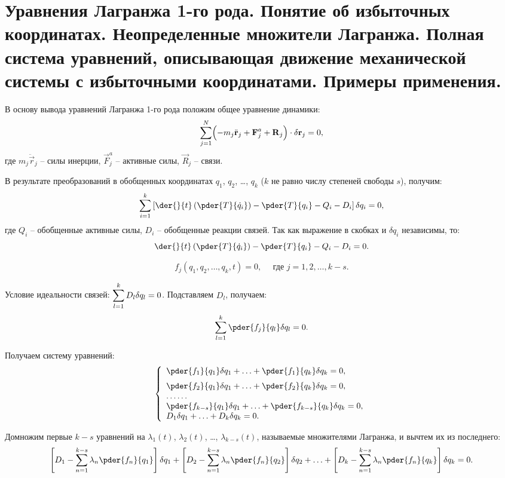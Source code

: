 \chapter{Уравнения Лагранжа 1-го рода. Понятие об избыточных координатах.
Неопределенные множители Лагранжа. Полная система уравнений, описывающая
движение механической системы с избыточными координатами. Примеры применения.}

В основу вывода уравнений Лагранжа 1-го рода положим общее уравнение динамики:
\[
    \sum\limits_{j=1}^N \Bigl(-m_j\ddot{\vec{r}}_j + \vec{F}^a_j + \vec{R}_j
    \Bigr)\cdot\delta\vec{r}_j = 0,
\]
где \( m_j\ddot{\vec{r}}_j \) -- силы инерции, \( \vec{F}^a_j \) -- активные
силы, \( \vec{R}_j \) -- связи.


В результате преобразований в обобщенных координатах \( q_1 \), \( q_2 \),
\ldots, \( q_k \) (\( k \) не равно числу степеней свободы \( s \)), получим:
\[
    \sum\limits_{i=1}^k \left[\der{}{t}\left(\pder{T}{\dot{q}_i}\right) -
    \pder{T}{q_i} - Q_i - D_i\right]\delta q_i = 0,
\]
где \( Q_i \) -- обобщенные активные силы, \( D_i \) -- обобщенные реакции
связей. Так как выражение в скобках и \( \delta q_i \) независимы, то:
\[
    \der{}{t}\left(\pder{T}{\dot{q}_i}\right) - \pder{T}{q_i} - Q_i - D_i = 0.
\]


\[
    f_j(q_1, q_2, \ldots, q_k, t) = 0, \quad \text{ где } j = 1, 2, \ldots, k-s.
\]

Условие идеальности связей: \( \ds \sum_{l=1}^k D_l\delta q_l = 0 \).
Подставляем \( D_l \), получаем:
\[
    \sum\limits_{l=1}^k \pder{f_j}{q_l}\delta q_l = 0.
\]

Получаем систему уравнений:
\[
    \left\{ \begin{array}{l}
       \ds\pder{f_1}{q_1}\delta q_1+\ldots+\pder{f_1}{q_k}\delta q_k =0,\\[.6em]
       \ds \pder{f_2}{q_1}\delta q_1 + \ldots + \pder{f_2}{q_k}\delta q_k = 0,\\
       \ldots\ldots \\
       \ds \pder{f_{k-s}}{q_1}\delta q_1 + \ldots + \pder{f_{k-s}}{q_k}\delta
       q_k = 0, \\
       D_1\delta q_1 + \ldots + D_k \delta q_k = 0.
    \end{array} \right.
\]

Домножим первые \( k - s \) уравнений на \( \lambda_1(t) \), \( \lambda_2(t) \),
\ldots, \( \lambda_{k-s}(t) \), называемые множителями Лагранжа, и вычтем их из
последнего:
\[
    \left[D_1 - \sum_{n=1}^{k-s}\lambda_n\pder{f_n}{q_1}\right]\delta q_1 +
    \left[D_2 - \sum_{n=1}^{k-s}\lambda_n\pder{f_n}{q_2}\right]\delta q_2 +
    \ldots +
    \left[D_k - \sum_{n=1}^{k-s}\lambda_n\pder{f_n}{q_k}\right]\delta q_k = 0.
\]

